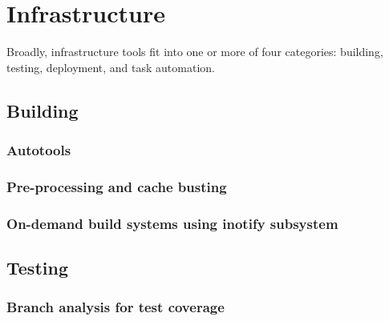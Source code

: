 \chapter{Infrastructure}\label{chap:infrastructure}




Broadly, infrastructure tools fit into one or more of four categories:
building, testing, deployment, and task automation.

\lipsum[1]

\section{Building}

\lipsum[11]

\subsection{Autotools}


\subsection{Pre-processing and cache busting}


\subsection{On-demand build systems using inotify subsystem}

\section{Testing}

\lipsum[13-14]

\subsection{Branch analysis for test coverage}

\lipsum[12-16]

